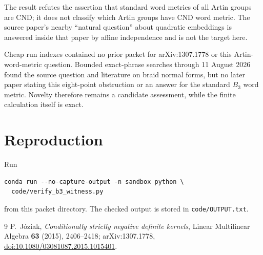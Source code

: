 \documentclass[10pt]{article}
\begin{document}
The result refutes the assertion that standard word metrics of all Artin
groups are CND; it does not classify which Artin groups have CND word metric.
The source paper's nearby ``natural question'' about quadratic embeddings is
answered inside that paper by affine independence and is not the target here.

Cheap run indexes contained no prior packet for arXiv:1307.1778 or this
Artin-word-metric question.  Bounded exact-phrase searches through 11 August
2026 found the source question and literature on braid normal forms, but no
later paper stating this eight-point obstruction or an answer for the standard
\(B_3\) word metric.  Novelty therefore remains a candidate assessment, while
the finite calculation itself is exact.

\section*{Reproduction}

Run
\begin{verbatim}
conda run --no-capture-output -n sandbox python \
  code/verify_b3_witness.py
\end{verbatim}
from this packet directory.  The checked output is stored in
\texttt{code/OUTPUT.txt}.

{\small
\begin{thebibliography}{9}
P.~J\'oziak,
\emph{Conditionally strictly negative definite kernels},
Linear Multilinear Algebra \textbf{63} (2015), 2406--2418;
arXiv:1307.1778,
\href{https://doi.org/10.1080/03081087.2015.1015401}{doi:10.1080/03081087.2015.1015401}.
\end{thebibliography}
}
\end{document}
